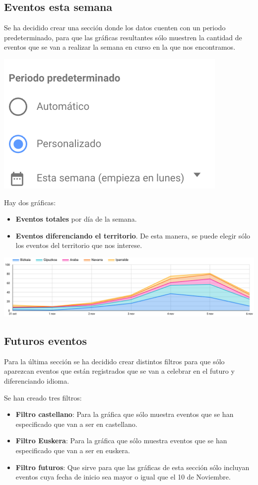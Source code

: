 \documentclass{\ClassPath/viu-tfm-template}
\begin{document}
\subsection{Eventos esta semana}

Se ha decidido crear una sección donde los datos cuenten con un periodo predeterminado, para que las gráficas resultantes sólo muestren la cantidad de eventos que se van a realizar la semana en curso en la que nos encontramos.

\begin{center}
    \includegraphics[frame,width=0.3\linewidth]{img/periodo.png}
\end{center}

Hay dos gráficas:

\begin{itemize}
    \item \textbf{Eventos totales} por día de la semana.
    \item \textbf{Eventos diferenciando el territorio}. De esta manera, se puede elegir sólo los eventos del territorio que nos interese.
\end{itemize}

\begin{center}
    \includegraphics[width=0.9\linewidth]{img/semana.png}
\end{center}


\subsection{Futuros eventos}

Para la última sección se ha decidido crear distintos filtros para que sólo aparezcan eventos que están registrados que se van a celebrar en el futuro y diferenciando idioma.

Se han creado tres filtros:
\begin{itemize}
    \item \textbf{Filtro castellano}: Para la gráfica que sólo muestra eventos que se han especificado que van a ser en castellano.
    \item \textbf{Filtro Euskera}: Para la gráfica que sólo muestra eventos que se han especificado que van a ser en euskera.
    \item \textbf{Filtro futuros}: Que sirve para que las gráficas de esta sección sólo incluyan eventos cuya fecha de inicio sea mayor o igual que el 10 de Noviembre.
\end{itemize}
\end{document}
